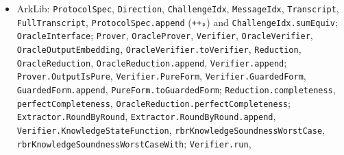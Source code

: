 \begin{itemize}
\item ArkLib: \texttt{ProtocolSpec}, \texttt{Direction}, \texttt{ChallengeIdx}, \texttt{MessageIdx}, \texttt{Transcript}, \texttt{FullTranscript}, \texttt{ProtocolSpec.\allowbreak{}append} (\texttt{++ₚ}) and \texttt{ChallengeIdx.\allowbreak{}sumEquiv}; \texttt{OracleInterface}; \texttt{Prover}, \texttt{OracleProver}, \texttt{Verifier}, \texttt{OracleVerifier}, \texttt{OracleOutputEmbedding}, \texttt{OracleVerifier.\allowbreak{}toVerifier}, \texttt{Reduction}, \texttt{OracleReduction}, \texttt{OracleReduction.\allowbreak{}append}, \texttt{Verifier.\allowbreak{}append}; \texttt{Prover.\allowbreak{}OutputIsPure}, \texttt{Verifier.\allowbreak{}PureForm}, \texttt{Verifier.\allowbreak{}GuardedForm}, \texttt{GuardedForm.\allowbreak{}append}, \texttt{PureForm.\allowbreak{}toGuardedForm}; \texttt{Reduction.\allowbreak{}completeness}, \texttt{perfectCompleteness}, \texttt{O\allowbreak{}r\allowbreak{}a\allowbreak{}c\allowbreak{}l\allowbreak{}e\allowbreak{}R\allowbreak{}e\allowbreak{}d\allowbreak{}u\allowbreak{}c\allowbreak{}t\allowbreak{}i\allowbreak{}o\allowbreak{}n\allowbreak{}.\allowbreak{}p\allowbreak{}e\allowbreak{}r\allowbreak{}f\allowbreak{}e\allowbreak{}c\allowbreak{}t\allowbreak{}C\allowbreak{}o\allowbreak{}m\allowbreak{}p\allowbreak{}l\allowbreak{}e\allowbreak{}t\allowbreak{}e\allowbreak{}n\allowbreak{}e\allowbreak{}s\allowbreak{}s}; \texttt{Extractor.\allowbreak{}RoundByRound}, \texttt{E\allowbreak{}x\allowbreak{}t\allowbreak{}r\allowbreak{}a\allowbreak{}c\allowbreak{}t\allowbreak{}o\allowbreak{}r\allowbreak{}.\allowbreak{}R\allowbreak{}o\allowbreak{}u\allowbreak{}n\allowbreak{}d\allowbreak{}B\allowbreak{}y\allowbreak{}R\allowbreak{}o\allowbreak{}u\allowbreak{}n\allowbreak{}d\allowbreak{}.\allowbreak{}a\allowbreak{}p\allowbreak{}p\allowbreak{}e\allowbreak{}n\allowbreak{}d}, \texttt{V\allowbreak{}e\allowbreak{}r\allowbreak{}i\allowbreak{}f\allowbreak{}i\allowbreak{}e\allowbreak{}r\allowbreak{}.\allowbreak{}K\allowbreak{}n\allowbreak{}o\allowbreak{}w\allowbreak{}l\allowbreak{}e\allowbreak{}d\allowbreak{}g\allowbreak{}e\allowbreak{}S\allowbreak{}t\allowbreak{}a\allowbreak{}t\allowbreak{}e\allowbreak{}F\allowbreak{}u\allowbreak{}n\allowbreak{}c\allowbreak{}t\allowbreak{}i\allowbreak{}o\allowbreak{}n}, \texttt{r\allowbreak{}b\allowbreak{}r\allowbreak{}K\allowbreak{}n\allowbreak{}o\allowbreak{}w\allowbreak{}l\allowbreak{}e\allowbreak{}d\allowbreak{}g\allowbreak{}e\allowbreak{}S\allowbreak{}o\allowbreak{}u\allowbreak{}n\allowbreak{}d\allowbreak{}n\allowbreak{}e\allowbreak{}s\allowbreak{}s\allowbreak{}W\allowbreak{}o\allowbreak{}r\allowbreak{}s\allowbreak{}t\allowbreak{}C\allowbreak{}a\allowbreak{}s\allowbreak{}e}, \texttt{r\allowbreak{}b\allowbreak{}r\allowbreak{}K\allowbreak{}n\allowbreak{}o\allowbreak{}w\allowbreak{}l\allowbreak{}e\allowbreak{}d\allowbreak{}g\allowbreak{}e\allowbreak{}S\allowbreak{}o\allowbreak{}u\allowbreak{}n\allowbreak{}d\allowbreak{}n\allowbreak{}e\allowbreak{}s\allowbreak{}s\allowbreak{}W\allowbreak{}o\allowbreak{}r\allowbreak{}s\allowbreak{}t\allowbreak{}C\allowbreak{}a\allowbreak{}s\allowbreak{}e\allowbreak{}W\allowbreak{}i\allowbreak{}t\allowbreak{}h}; \texttt{Verifier.\allowbreak{}run}, 
\end{itemize}
